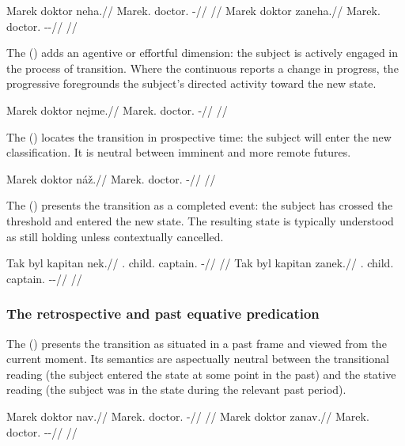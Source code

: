 \pex
\a
\begingl
\gla Marek doktor neha.//
\glb Marek.\Dir{} doctor.\Dir{} \Cop{}-\Cont{}//
\glft {}//
\endgl
\a
\begingl
\gla Marek doktor zaneha.//
\glb Marek.\Dir{} doctor.\Dir{} \Neg{}-\Cop{}-\Cont{}//
\glft {}//
\endgl
\xe

The  () adds an agentive or effortful dimension:
the subject is actively engaged in the process of transition. Where the
continuous reports a change in progress, the progressive foregrounds the subject's
directed activity toward the new state.

\ex
\begingl
\gla Marek doktor nejme.//
\glb Marek.\Dir{} doctor.\Dir{} \Cop{}-\Prog{}//
\glft {}//
\endgl
\xe

The \Ctpl{} () locates the transition in prospective
time: the subject will enter the new classification. It is neutral between
imminent and more remote futures.

\ex
\begingl
\gla Marek doktor náž.//
\glb Marek.\Dir{} doctor.\Dir{} \Cop{}-\Ctpl{}//
\glft {}//
\endgl
\xe

The  () presents the transition as a completed
event: the subject has crossed the threshold and entered the new state. The
resulting state is typically understood as still holding unless contextually
cancelled.

\pex
\a
\begingl
\gla Tak byl kapitan nek.//
\glb \Dem{}.\Prox{} child.\Dir{} captain.\Dir{} \Cop{}-\Pf{}//
\glft {}//
\endgl
\a
\begingl
\gla Tak byl kapitan zanek.//
\glb \Dem{}.\Prox{} child.\Dir{} captain.\Dir{} \Neg{}-\Cop{}-\Pf{}//
\glft {}//
\endgl
\xe

\subsubsection{The retrospective and past equative predication}%
\label{sec:neh-past}

The  () presents the transition as situated in a
past frame and viewed from the current moment. Its semantics are aspectually
neutral between the transitional reading (the subject entered the state at some
point in the past) and the stative reading (the subject was in the state during
the relevant past period).

\pex
\a
\begingl
\gla Marek doktor nav.//
\glb Marek.\Dir{} doctor.\Dir{} \Cop{}-\Ret{}//
\glft {}//
\endgl
\a
\begingl
\gla Marek doktor zanav.//
\glb Marek.\Dir{} doctor.\Dir{} \Neg{}-\Cop{}-\Ret{}//
\glft {}//
\endgl
\xe

